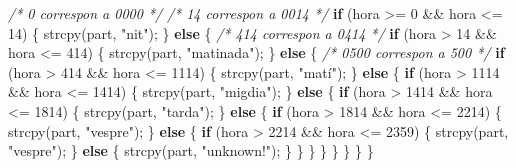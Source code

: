 \documentclass[
]{book}
\newenvironment{Shaded}{\begin{snugshade}}{\end{snugshade}}
\newcommand{\CommentTok}[1]{\textcolor[rgb]{0.56,0.35,0.01}{\textit{#1}}}
\newcommand{\ControlFlowTok}[1]{\textcolor[rgb]{0.13,0.29,0.53}{\textbf{#1}}}
\newcommand{\DecValTok}[1]{\textcolor[rgb]{0.00,0.00,0.81}{#1}}
\newcommand{\NormalTok}[1]{#1}
\newcommand{\StringTok}[1]{\textcolor[rgb]{0.31,0.60,0.02}{#1}}
\begin{document}
\begin{Shaded}
\begin{Highlighting}[]
    \CommentTok{/* 0 correspon a 0000 */}
    \CommentTok{/* 14 correspon a 0014 */}
    \ControlFlowTok{if}\NormalTok{ (hora \textgreater{}= }\DecValTok{0}\NormalTok{ \&\& hora \textless{}= }\DecValTok{14}\NormalTok{) \{}
\NormalTok{        strcpy(part, }\StringTok{"nit"}\NormalTok{);}
\NormalTok{    \} }\ControlFlowTok{else}\NormalTok{ \{}
        \CommentTok{/* 414 correspon a 0414 */}
        \ControlFlowTok{if}\NormalTok{ (hora \textgreater{} }\DecValTok{14}\NormalTok{ \&\& hora \textless{}= }\DecValTok{414}\NormalTok{) \{}
\NormalTok{            strcpy(part, }\StringTok{"matinada"}\NormalTok{);}
\NormalTok{        \} }\ControlFlowTok{else}\NormalTok{ \{}
            \CommentTok{/* 0500 correspon a 500 */}
            \ControlFlowTok{if}\NormalTok{ (hora \textgreater{} }\DecValTok{414}\NormalTok{ \&\& hora \textless{}= }\DecValTok{1114}\NormalTok{) \{}
\NormalTok{                strcpy(part, }\StringTok{"matí"}\NormalTok{);}
\NormalTok{            \} }\ControlFlowTok{else}\NormalTok{ \{}
                \ControlFlowTok{if}\NormalTok{ (hora \textgreater{} }\DecValTok{1114}\NormalTok{ \&\& hora \textless{}= }\DecValTok{1414}\NormalTok{) \{}
\NormalTok{                    strcpy(part, }\StringTok{"migdia"}\NormalTok{);}
\NormalTok{                \} }\ControlFlowTok{else}\NormalTok{ \{}
                    \ControlFlowTok{if}\NormalTok{ (hora \textgreater{} }\DecValTok{1414}\NormalTok{ \&\& hora \textless{}= }\DecValTok{1814}\NormalTok{) \{}
\NormalTok{                        strcpy(part, }\StringTok{"tarda"}\NormalTok{);}
\NormalTok{                    \} }\ControlFlowTok{else}\NormalTok{ \{}
                        \ControlFlowTok{if}\NormalTok{ (hora \textgreater{} }\DecValTok{1814}\NormalTok{ \&\& hora \textless{}= }\DecValTok{2214}\NormalTok{) \{}
\NormalTok{                            strcpy(part, }\StringTok{"vespre"}\NormalTok{);}
\NormalTok{                        \} }\ControlFlowTok{else}\NormalTok{ \{}
                            \ControlFlowTok{if}\NormalTok{ (hora \textgreater{} }\DecValTok{2214}\NormalTok{ \&\& hora \textless{}= }\DecValTok{2359}\NormalTok{) \{}
\NormalTok{                                strcpy(part, }\StringTok{"vespre"}\NormalTok{);}
\NormalTok{                            \} }\ControlFlowTok{else}\NormalTok{ \{}
\NormalTok{                                strcpy(part, }\StringTok{"unknown!"}\NormalTok{);}
\NormalTok{                            \}}
\NormalTok{                        \}}
\NormalTok{                    \}}
\NormalTok{                \}}
\NormalTok{            \}}
\NormalTok{        \}}
\NormalTok{    \}}
\NormalTok{\}}
\end{Highlighting}
\end{Shaded}
\end{document}
